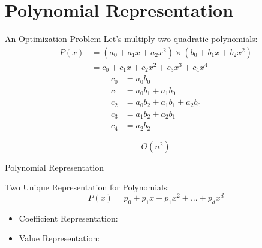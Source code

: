 \documentclass{beamer}
\begin{document}
	\section{Polynomial Representation}

\begin{frame}{An Optimization Problem}
    \pause
    Let's multiply two quadratic polynomials:
    \pause
    \begin{equation*}
        \begin{split}
            P(x) & = (a_0 + a_1x + a_2x^2) \times (b_0 + b_1x + b_2x^2) \\
                 & = c_0 + c_1x + c_2x^2 + c_3x^3 + c_4x^4
        \end{split}
    \end{equation*}
    \pause
    \begin{equation*}
        \begin{split}
            c_0 & = a_0b_0                   \\
            c_1 & = a_0b_1 + a_1b_0          \\
            c_2 & = a_0b_2 + a_1b_1 + a_2b_0 \\
            c_3 & = a_1b_2 + a_2b_1          \\
            c_4 & = a_2b_2
        \end{split}
    \end{equation*}

        $$O(n^2) $$
    \pause
\end{frame}
 
		\begin{frame}{Polynomial Representation}
                \centering
              
              Two Unique Representation for Polynomials: 
              \begin{equation*}
                  P(x) = p_0 + p_1x + p_1x^2 + ... + p_dx^d
              \end{equation*}
              \begin{itemize}
                  \item Coefficient Representation: 
                    \begin{equation*}
                        [p_0, p_1, p_2,... p_d]
                    \end{equation*}
                    \item Value Representation: 
                    \begin{equation*}
                        [(x_0, P(x_0)), (x_1, P(x_1)), ... (x_d, P(x_d))]  
                    \end{equation*}
              \end{itemize}
                
                
		\end{frame}
\end{document}
